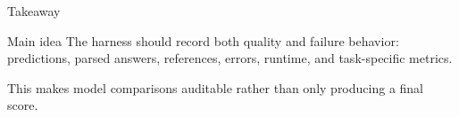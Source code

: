 \documentclass[aspectratio=169]{beamer}
\begin{document}
\begin{frame}{Takeaway}
  \begin{block}{Main idea}
    The harness should record both quality and failure behavior: predictions,
    parsed answers, references, errors, runtime, and task-specific metrics.
  \end{block}

  \vspace{0.8em}
  This makes model comparisons auditable rather than only producing a final score.
\end{frame}
\end{document}
